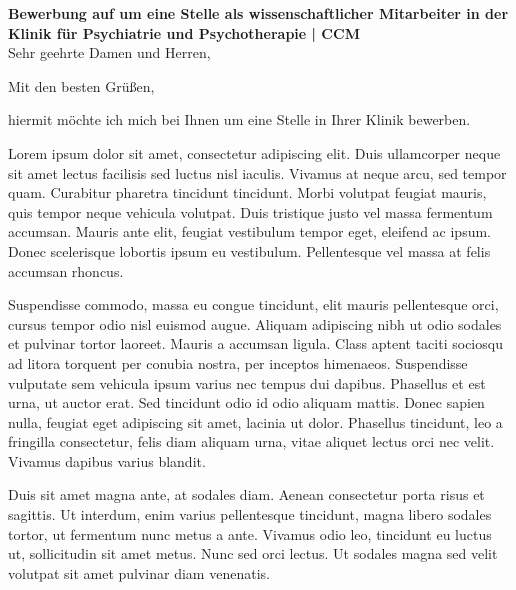 \documentclass[11pt, a4paper, roman]{moderncv}    %
\begin{document}
\opening{\textbf{Bewerbung auf um eine Stelle als wissenschaftlicher Mitarbeiter in der Klinik für Psychiatrie und Psychotherapie | CCM}\\[22pt]Sehr geehrte Damen und Herren,}
\closing{Mit den besten Grüßen,}
\vspace{24.7mm}
\makelettertitle

hiermit möchte ich mich bei Ihnen um eine Stelle in Ihrer Klinik bewerben.

Lorem ipsum dolor sit amet, consectetur adipiscing elit. Duis ullamcorper neque sit amet lectus facilisis sed luctus nisl iaculis. Vivamus at neque arcu, sed tempor quam. Curabitur pharetra tincidunt tincidunt. Morbi volutpat feugiat mauris, quis tempor neque vehicula volutpat. Duis tristique justo vel massa fermentum accumsan. Mauris ante elit, feugiat vestibulum tempor eget, eleifend ac ipsum. Donec scelerisque lobortis ipsum eu vestibulum. Pellentesque vel massa at felis accumsan rhoncus.

Suspendisse commodo, massa eu congue tincidunt, elit mauris pellentesque orci, cursus tempor odio nisl euismod augue. Aliquam adipiscing nibh ut odio sodales et pulvinar tortor laoreet. Mauris a accumsan ligula. Class aptent taciti sociosqu ad litora torquent per conubia nostra, per inceptos himenaeos. Suspendisse vulputate sem vehicula ipsum varius nec tempus dui dapibus. Phasellus et est urna, ut auctor erat. Sed tincidunt odio id odio aliquam mattis. Donec sapien nulla, feugiat eget adipiscing sit amet, lacinia ut dolor. Phasellus tincidunt, leo a fringilla consectetur, felis diam aliquam urna, vitae aliquet lectus orci nec velit. Vivamus dapibus varius blandit.

Duis sit amet magna ante, at sodales diam. Aenean consectetur porta risus et sagittis. Ut interdum, enim varius pellentesque tincidunt, magna libero sodales tortor, ut fermentum nunc metus a ante. Vivamus odio leo, tincidunt eu luctus ut, sollicitudin sit amet metus. Nunc sed orci lectus. Ut sodales magna sed velit volutpat sit amet pulvinar diam venenatis.


\makeletterclosing

\clearpage
\end{document}
